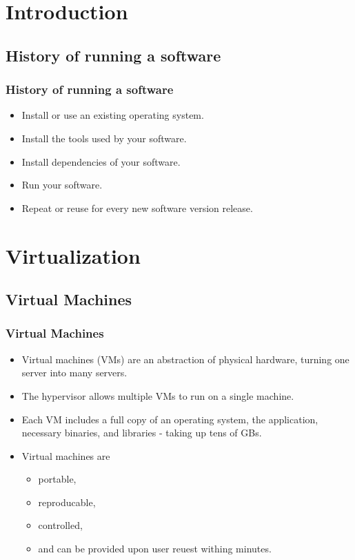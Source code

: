 
\section{Introduction}

\subsection{History of running a software}
\begin{frame}
	\frametitle{History of running a software}
	\begin{itemize}
		\item Install or use an existing operating system.
		\item Install the tools used by your software.
		\item Install dependencies of your software.
		\item Run your software.
		\item Repeat or reuse for every new software version release.
	\end{itemize}
\end{frame}

\section{Virtualization}

\subsection{Virtual Machines}
\begin{frame}
	\frametitle{Virtual Machines}
	\begin{itemize}
		\item Virtual machines (VMs) are an abstraction of physical hardware, turning one server into many servers.
		\item The hypervisor allows multiple VMs to run on a single machine.
		\item Each VM includes a full copy of an operating system, the application, necessary binaries, and libraries - taking up tens of GBs.
		\item Virtual machines are
		\begin{itemize}
			\item portable,
			\item reproducable,
			\item controlled,
			\item and can be provided upon user reuest withing minutes.
		\end{itemize}
	\end{itemize}
\end{frame}

